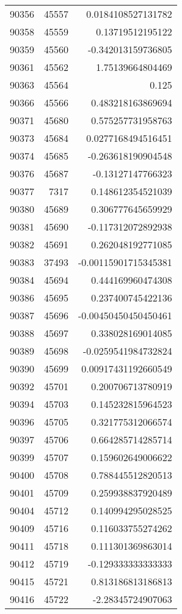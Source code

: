 \begin{tabular}{r | r | r}
90356 & 45557 & 0.0184108527131782 \\
90358 & 45559 & 0.13719512195122 \\
90359 & 45560 & -0.342013159736805 \\
90361 & 45562 & 1.75139664804469 \\
90363 & 45564 & 0.125 \\
90366 & 45566 & 0.483218163869694 \\
90371 & 45680 & 0.575257731958763 \\
90373 & 45684 & 0.0277168494516451 \\
90374 & 45685 & -0.263618190904548 \\
90376 & 45687 & -0.13127147766323 \\
90377 & 7317 & 0.148612354521039 \\
90380 & 45689 & 0.306777645659929 \\
90381 & 45690 & -0.117312072892938 \\
90382 & 45691 & 0.262048192771085 \\
90383 & 37493 & -0.00115901715345381 \\
90384 & 45694 & 0.444169960474308 \\
90386 & 45695 & 0.237400745422136 \\
90387 & 45696 & -0.00450450450450461 \\
90388 & 45697 & 0.338028169014085 \\
90389 & 45698 & -0.0259541984732824 \\
90390 & 45699 & 0.00917431192660549 \\
90392 & 45701 & 0.200706713780919 \\
90394 & 45703 & 0.145232815964523 \\
90396 & 45705 & 0.321775312066574 \\
90397 & 45706 & 0.664285714285714 \\
90399 & 45707 & 0.159602649006622 \\
90400 & 45708 & 0.788445512820513 \\
90401 & 45709 & 0.259938837920489 \\
90404 & 45712 & 0.140994295028525 \\
90409 & 45716 & 0.116033755274262 \\
90411 & 45718 & 0.111301369863014 \\
90412 & 45719 & -0.129333333333333 \\
90415 & 45721 & 0.813186813186813 \\
90416 & 45722 & -2.28345724907063 \\

\end{tabular}
